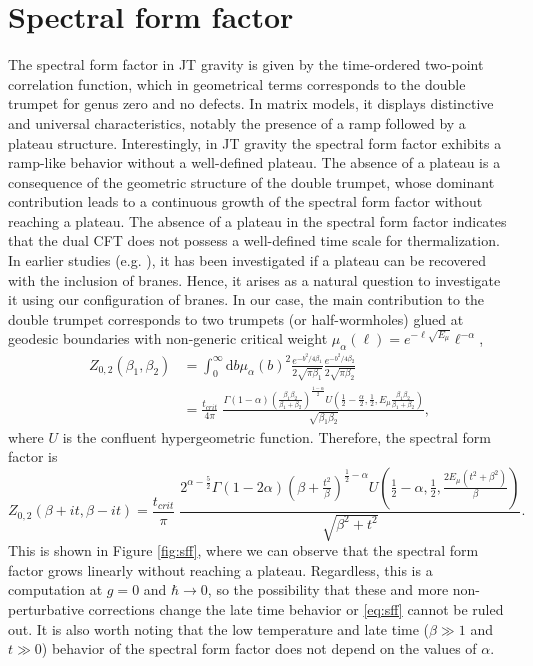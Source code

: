 \documentclass[a4paper,11pt]{article}
\newcommand{\rmd}{\mathrm{d}}
\begin{document}
\section{Spectral form factor}\label{section:SFF}
The spectral form factor in JT gravity is given by the time-ordered two-point correlation function, which in geometrical terms corresponds to the double trumpet for genus zero and no defects. 
In matrix models, it displays distinctive and universal characteristics, notably the presence of a ramp followed by a plateau structure. Interestingly, in JT gravity the spectral form factor exhibits a ramp-like behavior without a well-defined plateau.
The absence of a plateau is a consequence of the geometric structure of the double trumpet, whose dominant contribution leads to a continuous growth of the spectral form factor without reaching a plateau. The absence of a plateau in the spectral form factor indicates that the dual CFT does not possess a well-defined time scale for thermalization.\\
In earlier studies (e.g. \cite{Okuyama:2021FZZT}), it has been investigated if a plateau can be recovered with the inclusion of branes. Hence, it arises as a natural question to investigate it using our configuration of branes.
In our case, the main contribution to the double trumpet corresponds to two trumpets (or half-wormholes) glued at geodesic boundaries with non-generic critical weight $\mu_{\alpha}(\ell)= e^{-\ell \sqrt{E_\mu}}\ell^{-\alpha}$,
\begin{align}
    Z_{0,2}(\beta_1,\beta_2) &= \int_0^\infty \rmd b\mu_\alpha(b)^2\frac{e^{-b^2/4\beta_1}}{2\sqrt{\pi \beta_1}} \frac{e^{-b^2/4\beta_2}}{2\sqrt{\pi \beta_2}}\\
    &=   \frac{t_{crit}}{4\pi}\; \frac{\Gamma (1-\alpha ) \left(\frac{\beta_1\beta_2}{\beta_1+\beta_2}\right)^{\frac{1-\alpha }{2}} U\left(\frac{1}{2}-\frac{\alpha }{2},\frac{1}{2},E_\mu\frac{ \beta_1 \beta_2}{\beta_1+\beta_2}\right)}{ \sqrt{\beta_1\beta_2}},
\end{align}
where $U$ is the confluent hypergeometric function. Therefore, the spectral form factor is 
\begin{equation}
    Z_{0,2}(\beta+it,\beta-it)=\frac{t_{crit}}{\pi}\;\frac{2^{\alpha -\frac{5}{2}} \Gamma (1-2 \alpha ) \left(\beta +\frac{t^2}{\beta }\right)^{\frac{1}{2}-\alpha } U\left(\frac{1}{2}-\alpha ,\frac{1}{2},\frac{2E_\mu \left(t^2+\beta ^2\right)}{\beta }\right)}{ \sqrt{\beta ^2+t^2}}.\label{eq:sff}
\end{equation}
This is shown in Figure \ref{fig:sff}, where we can observe that the spectral form factor grows linearly without reaching a plateau. Regardless, this is a computation at $g=0$ and $\hbar\rightarrow 0$, so the possibility that these and more non-perturbative corrections change the late time behavior or \eqref{eq:sff} cannot be ruled out. It is also worth noting that the low temperature and late time ($\beta\gg 1$ and $t\gg 0$) behavior of the spectral form factor does not depend on the values of $\alpha$.     
\end{document}
